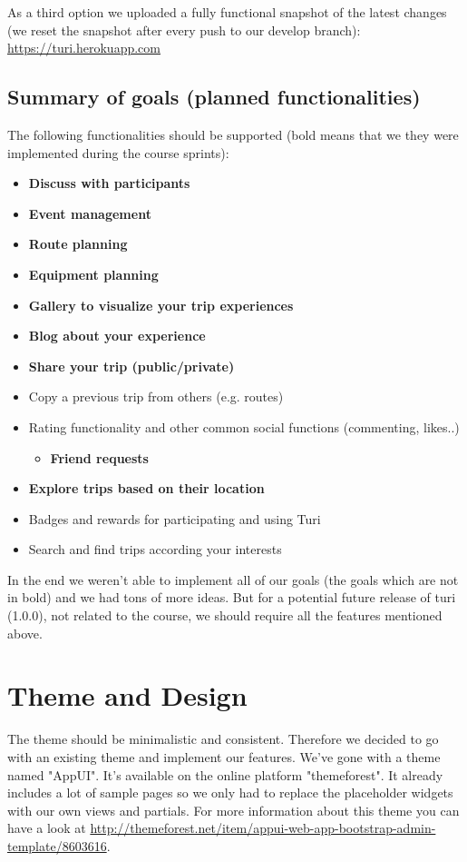 \documentclass[a4paper]{article}
\begin{document}
As a third option we uploaded a fully functional snapshot of the latest changes (we reset the snapshot after every push to our develop branch): \url{https://turi.herokuapp.com}

\subsection{Summary of goals (planned functionalities)}
The following functionalities should be supported (bold means that we they were implemented during the course sprints):
\begin{itemize}
  \item {\textbf{Discuss with participants}}
  \item {\textbf{Event management}}
  \item {\textbf{Route planning}}
  \item {\textbf{Equipment planning}}
  \item {\textbf{Gallery to visualize your trip experiences}}
  \item {\textbf{Blog about your experience}}
  \item {\textbf{Share your trip (public/private)}}
  \item {Copy a previous trip from others (e.g. routes)}
  \item {Rating functionality and other common social functions (commenting, likes..)
  \begin{itemize}
    \item {\textbf{Friend requests}}
  \end{itemize}}
  \item {\textbf{Explore trips based on their location}}
  \item {Badges and rewards for participating and using Turi}
  \item {Search and find trips according your interests}
\end{itemize}

In the end we weren't able to implement all of our goals (the goals which are not in bold) and we had tons of more ideas. But for  a potential future release of turi (1.0.0), not related to the course, we should require all the features mentioned above. \\

\noindent
\section{Theme and Design}
The theme should be minimalistic and consistent. Therefore we decided to go with an existing theme and implement our features. We've gone with a theme named "AppUI". It's available on the online platform "themeforest". It already includes a lot of sample pages so we only had to replace the placeholder widgets with our own views and partials. For more information about this theme you can have a look at \url{http://themeforest.net/item/appui-web-app-bootstrap-admin-template/8603616}.
\end{document}
